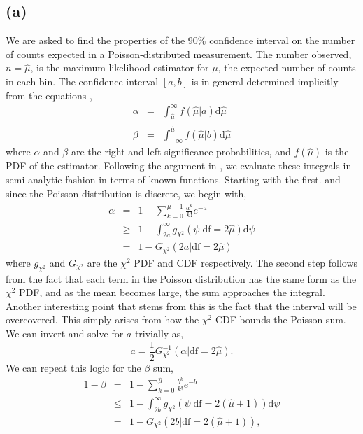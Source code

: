 \documentclass[12pt]{article}
\begin{document}
\subsection*{(a)}
We are asked to find the properties of the 90\% confidence interval on the number of counts expected in a Poisson-distributed measurement.  The number observed, $n = \hat{\mu}$, is the maximum likelihood estimator for $\mu$, the expected number of counts in each bin.  The confidence interval $[a,b]$ is in general determined implicitly from the equations \citep{cowan1998statistical},
\begin{eqnarray}
\alpha &=& \int_{\hat{\mu}}^{\infty} f(\hat{\mu} \vert a) \text{d} \hat{\mu}\\
\beta &=& \int_{- \infty}^{\hat{\mu}} f(\hat{\mu} \vert b) \text{d} \hat{\mu}
\end{eqnarray}
where $\alpha$ and $\beta$ are the right and left significance probabilities, and $f(\hat{\mu})$ is the PDF of the estimator.  Following the argument in \citet{cowan1998statistical}, we evaluate these integrals in semi-analytic fashion in terms of known functions. Starting with the first. and since the Poisson distribution is discrete, we begin with,
\begin{eqnarray}
\alpha &=& 1 - \sum_{k = 0}^{\hat{\mu} - 1} \frac{a^{k}}{k!} e^{-a}\\
&\geq& 1 - \int_{2 a}^{\infty} g_{\chi^2}(\psi \vert \text{df}=2\hat{\mu}) \text{d} \psi \\
&=& 1 - G_{\chi^2}(2 a \vert \text{df}=2\hat{\mu} )
\end{eqnarray}
where $g_{\chi^2}$ and $G_{\chi^2}$ are the $\chi^2$ PDF and CDF respectively.  The second step follows from the fact that each term in the Poisson distribution has the same form as the $\chi^2$ PDF, and as the mean becomes large, the sum approaches the integral.  Another interesting point that stems from this is the fact that the interval will be overcovered.  This simply arises from how the $\chi^2$ CDF bounds the Poisson sum.  We can invert and solve for $a$ trivially as,
\begin{equation} \label{eq:a}
a = \frac{1}{2} G^{-1}_{\chi^2} (\alpha \vert \text{df}=2\hat{\mu}).
\end{equation}
We can repeat this logic for the $\beta$ sum,
\begin{eqnarray}
1 - \beta &=& 1 - \sum_{k = 0}^{\hat{\mu}} \frac{b^{k}}{k!} e^{-b}\\
&\leq& 1 - \int_{2 b}^{\infty} g_{\chi^2}(\psi \vert \text{df}=2(\hat{\mu} + 1)) \text{d} \psi \\
&=& 1 - G_{\chi^2}(2 b \vert \text{df}=2(\hat{\mu} + 1) ),
\end{eqnarray}
\end{document}
